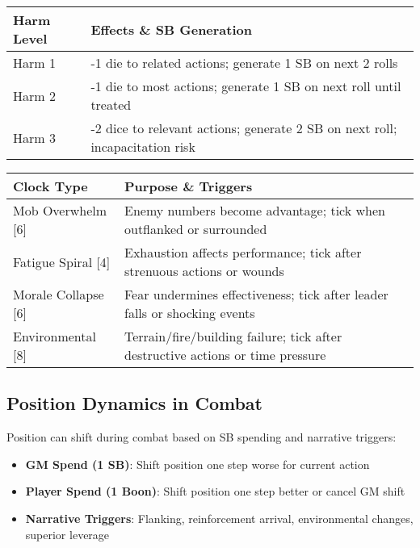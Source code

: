 \begin{fatebox}
\begin{tabularx}{\textwidth}{lX}
\toprule
\textbf{Harm Level} & \textbf{Effects \& SB Generation} \\
\midrule
Harm 1 & -1 die to related actions; generate 1 SB on next 2 rolls \\
Harm 2 & -1 die to most actions; generate 1 SB on next roll until treated \\
Harm 3 & -2 dice to relevant actions; generate 2 SB on next roll; incapacitation risk \\
\bottomrule
\end{tabularx}
\end{fatebox}

\begin{fatebox}
\begin{tabularx}{\textwidth}{lX}
\toprule
\textbf{Clock Type} & \textbf{Purpose \& Triggers} \\
\midrule
Mob Overwhelm [6] & Enemy numbers become advantage; tick when outflanked or surrounded \\
Fatigue Spiral [4] & Exhaustion affects performance; tick after strenuous actions or wounds \\
Morale Collapse [6] & Fear undermines effectiveness; tick after leader falls or shocking events \\
Environmental [8] & Terrain/fire/building failure; tick after destructive actions or time pressure \\
\bottomrule
\end{tabularx}
\end{fatebox}

\subsection{Position Dynamics in Combat}

Position can shift during combat based on SB spending and narrative triggers:

\begin{itemize}
    \item \textbf{GM Spend (1 SB)}: Shift position one step worse for current action
    \item \textbf{Player Spend (1 Boon)}: Shift position one step better or cancel GM shift
    \item \textbf{Narrative Triggers}: Flanking, reinforcement arrival, environmental changes, superior leverage
\end{itemize}

